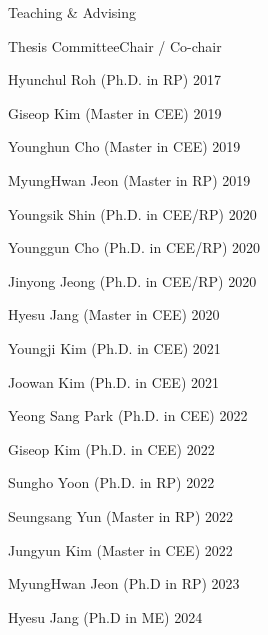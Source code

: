 \begin{rSection}{Teaching \& Advising}
\begin{rSubsection}{Thesis Committee}{}{Chair / Co-chair }{}
  \item Hyunchul Roh (Ph.D. in \ac{RP}) \hfill 2017
  \item Giseop Kim (Master in \ac{CEE}) \hfill 2019
  \item Younghun Cho (Master in \ac{CEE}) \hfill 2019
  \item MyungHwan Jeon (Master in \ac{RP}) \hfill 2019
  \item Youngsik Shin (Ph.D. in \ac{CEE}/\ac{RP}) \hfill 2020
  \item Younggun Cho (Ph.D. in \ac{CEE}/\ac{RP}) \hfill 2020
  \item Jinyong Jeong (Ph.D. in \ac{CEE}/\ac{RP}) \hfill 2020
  \item Hyesu Jang (Master in \ac{CEE}) \hfill 2020
  \item Youngji Kim (Ph.D. in \ac{CEE}) \hfill 2021
  \item Joowan Kim (Ph.D. in \ac{CEE}) \hfill 2021
  \item Yeong Sang Park (Ph.D. in \ac{CEE}) \hfill 2022
  \item Giseop Kim (Ph.D. in \ac{CEE}) \hfill 2022
  \item Sungho Yoon (Ph.D. in \ac{RP}) \hfill 2022
  \item Seungsang Yun (Master in \ac{RP}) \hfill 2022
  \item Jungyun Kim (Master in \ac{CEE}) \hfill 2022
  \item MyungHwan Jeon (Ph.D in \ac{RP}) \hfill 2023
  \item Hyesu Jang (Ph.D in \ac{ME}) \hfill 2024
\end{rSubsection}

\end{rSection}
